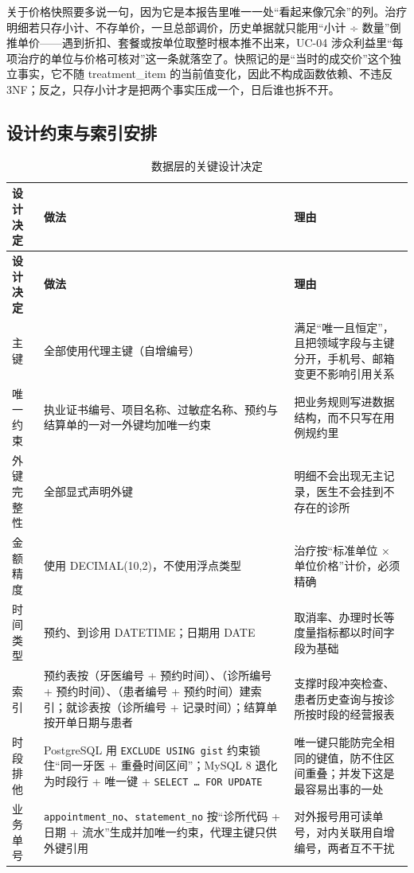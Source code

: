\documentclass[11pt,a4paper]{ctexart}
\renewcommand{\arraystretch}{1.28}
\begin{document}
关于价格快照要多说一句，因为它是本报告里唯一一处“看起来像冗余”的列。治疗明细若只存小计、不存单价，一旦总部调价，历史单据就只能用“小计 ÷ 数量”倒推单价——遇到折扣、套餐或按单位取整时根本推不出来，UC-04 涉众利益里“每项治疗的单位与价格可核对”这一条就落空了。快照记的是“当时的成交价”这个独立事实，它不随 treatment\_item 的当前值变化，因此不构成函数依赖、不违反 3NF；反之，只存小计才是把两个事实压成一个，日后谁也拆不开。

\subsection{设计约束与索引安排}

{\footnotesize\renewcommand{\arraystretch}{1.12}
\begin{longtable}{@{}L{3.7cm}L{6.3cm}L{5.3cm}@{}}
\caption{数据层的关键设计决定}\\
\toprule
\textbf{\textcolor{adcblue!92}{设计决定}} & \textbf{\textcolor{adcblue!92}{做法}} & \textbf{\textcolor{adcblue!92}{理由}} \\
\midrule
\endfirsthead
\toprule
\textbf{\textcolor{adcblue!92}{设计决定}} & \textbf{\textcolor{adcblue!92}{做法}} & \textbf{\textcolor{adcblue!92}{理由}} \\
\midrule
\endhead
\bottomrule
\endfoot
主键 & 全部使用代理主键（自增编号） & 满足“唯一且恒定”，且把领域字段与主键分开，手机号、邮箱变更不影响引用关系 \\
唯一约束 & 执业证书编号、项目名称、过敏症名称、预约与结算单的一对一外键均加唯一约束 & 把业务规则写进数据结构，而不只写在用例规约里 \\
外键完整性 & 全部显式声明外键 & 明细不会出现无主记录，医生不会挂到不存在的诊所 \\
金额精度 & 使用 DECIMAL(10,2)，不使用浮点类型 & 治疗按“标准单位 × 单位价格”计价，必须精确 \\
时间类型 & 预约、到诊用 DATETIME；日期用 DATE & 取消率、办理时长等度量指标都以时间字段为基础 \\
索引 & 预约表按（牙医编号 + 预约时间）、（诊所编号 + 预约时间）、（患者编号 + 预约时间）建索引；就诊表按（诊所编号 + 记录时间）；结算单按开单日期与患者 & 支撑时段冲突检查、患者历史查询与按诊所按时段的经营报表 \\
时段排他 & PostgreSQL 用 \texttt{EXCLUDE USING gist} 约束锁住“同一牙医 + 重叠时间区间”；MySQL 8 退化为时段行 + 唯一键 + \texttt{SELECT \dots\ FOR UPDATE} & 唯一键只能防完全相同的键值，防不住区间重叠；并发下这是最容易出事的一处 \\
业务单号 & \texttt{appointment\_no}、\texttt{statement\_no} 按“诊所代码 + 日期 + 流水”生成并加唯一约束，代理主键只供外键引用 & 对外报号用可读单号，对内关联用自增编号，两者互不干扰 \\

\end{longtable}}
\end{document}
